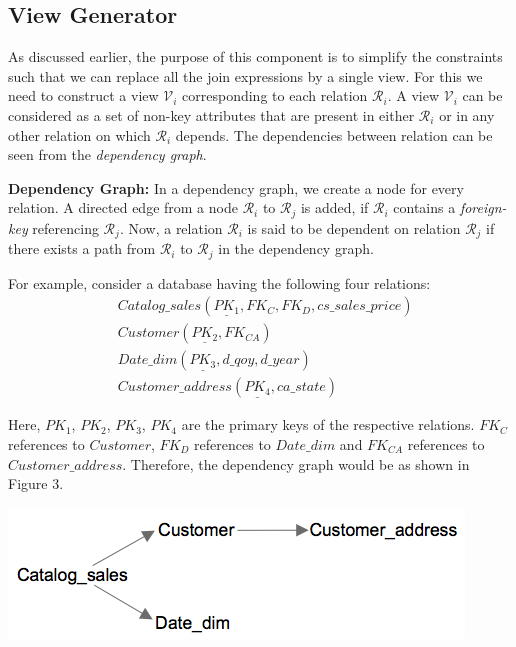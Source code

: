 \documentclass[]{article}
\newenvironment{Figure}
  {\par\medskip\noindent\minipage{\linewidth}}
  {\endminipage\par\medskip}
\begin{document}
\begin{multicols}{2}
		\subsection{View Generator}
			As discussed earlier, the purpose of this component is to simplify the constraints such that we can replace all the join expressions by a single view. 
			For this we need to construct a view $\mathcal{V}_{i}$ corresponding to each relation $\mathcal{R}_{i}$. 
			A view $\mathcal{V}_{i}$ can be considered as a set of non-key attributes that are present in either $\mathcal{R}_{i}$ or in any other relation on which $\mathcal{R}_{i}$ depends. 
			The dependencies between relation can be seen from the {\em dependency graph}.
			
			{\bf Dependency Graph:} 
			In a dependency graph, we create a node for every relation. 
			A directed edge from a node $\mathcal{R}_{i}$ to $\mathcal{R}_{j}$ is added, if $\mathcal{R}_{i}$ contains a {\em foreign-key} referencing $\mathcal{R}_{j}$.
			Now, a relation $\mathcal{R}_{i}$ is said to be dependent on relation $\mathcal{R}_{j}$ if there exists a path from $\mathcal{R}_{i}$ to $\mathcal{R}_{j}$ in the dependency graph.
		
			For example, consider a database having the following four relations:
			\begin{align*}
				& Catalog\_sales (\underline {PK_{1}}, FK_{C}, FK_{D}, cs\_sales\_price) \\
				& Customer (\underline {PK_{2}}, FK_{CA}) \\
				& Date\_dim (\underline {PK_{3}}, d\_qoy, d\_year) \\
				& Customer\_address (\underline {PK_{4}}, ca\_state)
			\end{align*}
			
			Here, $PK_{1}$, $PK_{2}$, $PK_{3}$, $PK_{4}$ are the primary keys of the respective relations. 
			$FK_{C}$ references to $Customer$, $FK_{D}$ references to $Date\_dim$ and $FK_{CA}$ references to $Customer\_address$. 
			Therefore, the dependency graph would be as shown in Figure 3. 
			
			\begin{Figure}
				\centering
				\includegraphics[width=\linewidth]{figures/schema_dig.png}
				\label{fig:dependency-graph}
			\end{Figure}
			

\end{multicols}
\end{document}
